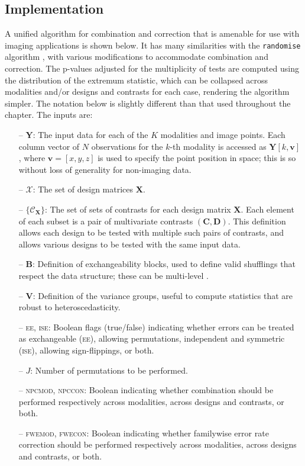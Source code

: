 \subsection{Implementation}
\label{sec:comb:implementation}

A unified algorithm for combination and correction that is amenable for use with imaging applications is shown below. It has many similarities with the \texttt{randomise} algorithm \citep[Section~\ref{sec:perm:randomise};][]{Winkler2014}, with various modifications to accommodate combination and correction. The p-values adjusted for the multiplicity of tests are computed using the distribution of the extremum statistic, which can be collapsed across modalities and/or designs and contrasts for each case, rendering the algorithm simpler. The notation below is slightly different than that used throughout the chapter. The inputs are:

\begin{itemize}
\item[--] $\mathbf{Y}$: The input data for each of the $K$ modalities and image points. Each column vector of $N$ observations for the $k$-th modality is accessed as $\mathbf{Y}[k,\mathbf{v}]$, where $\mathbf{v}=[x, y, z]$ is used to specify the point position in space; this is so without loss of generality for non-imaging data.
\item[--] $\mathcal{X}$:  The set of design matrices $\mathbf{X}$.
\item[--] $\{\mathcal{C}_\mathbf{X}\}$: The set of sets of contrasts for each design matrix $\mathbf{X}$. Each element of each subset is a pair of multivariate contrasts $(\mathbf{C},\mathbf{D})$. This definition allows each design to be tested with multiple such pairs of contrasts, and allows various designs to be tested with the same input data.
\item[--] $\mathbf{B}$: Definition of exchangeability blocks, used to define valid shufflings that respect the data structure; these can be multi-level \citep{Winkler2015}.
\item[--] $\mathbf{V}$: Definition of the variance groups, useful to compute statistics that are robust to heteroscedasticity.
\item[--] \textsc{ee}, \textsc{ise}: Boolean flags (true/false) indicating whether errors can be treated as exchangeable (\textsc{ee}), allowing permutations, independent and symmetric (\textsc{ise}), allowing sign-flippings, or both.
\item[--] $J$: Number of permutations to be performed.
\item[--] \textsc{npcmod}, \textsc{npccon}: Boolean indicating whether combination should be performed respectively across modalities, across designs and contrasts, or both.
\item[--] \textsc{fwemod}, \textsc{fwecon}: Boolean indicating whether familywise error rate correction should be performed respectively across modalities, across designs and contrasts, or both.
\end{itemize}

